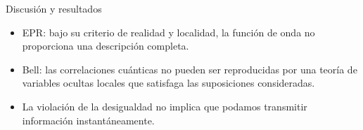 \begin{frame}{Discusión y resultados}{}
	\begin{itemize}
		\item EPR: bajo su criterio de realidad y localidad, la función de onda no proporciona una descripción completa.\vspace{3mm}
		\item Bell: las correlaciones cuánticas no pueden ser reproducidas por una teoría de variables ocultas locales que satisfaga las suposiciones consideradas.\vspace{3mm}
		\item La violación de la desigualdad no implica que podamos transmitir información instantáneamente.
	\end{itemize}
\end{frame}